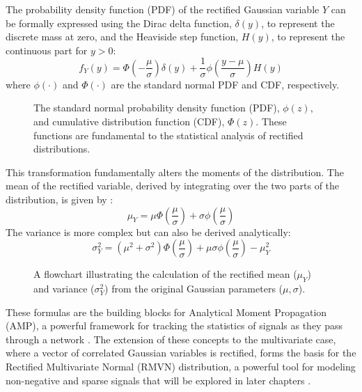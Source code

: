 The probability density function (PDF) of the rectified Gaussian variable $Y$ can be formally expressed using the Dirac delta function, $\delta(y)$, to represent the discrete mass at zero, and the Heaviside step function, $H(y)$, to represent the continuous part for $y > 0$:
\[ f_Y(y) = \Phi\left(-\frac{\mu}{\sigma}\right) \delta(y) + \frac{1}{\sigma} \phi\left(\frac{y-\mu}{\sigma}\right) H(y) \]
where $\phi(\cdot)$ and $\Phi(\cdot)$ are the standard normal PDF and CDF, respectively.

\begin{figure}[h!]
    \centering
    \scalebox{0.9}{\normalpdfcdfplot}
    \caption{The standard normal probability density function (PDF), $\phi(z)$, and cumulative distribution function (CDF), $\Phi(z)$. These functions are fundamental to the statistical analysis of rectified distributions.}
    \label{fig:normal_plot}
\end{figure}

This transformation fundamentally alters the moments of the distribution. The mean of the rectified variable, derived by integrating over the two parts of the distribution, is given by \cite{Socci1998RectifiedGaussian}:
\begin{equation}
 \mu_Y = \mu \Phi\left(\frac{\mu}{\sigma}\right) + \sigma \phi\left(\frac{\mu}{\sigma}\right)
\end{equation}
The variance is more complex but can also be derived analytically:
\begin{equation}
 \sigma^2_Y = (\mu^2 + \sigma^2)\Phi\left(\frac{\mu}{\sigma}\right) + \mu\sigma\phi\left(\frac{\mu}{\sigma}\right) - \mu_Y^2
\end{equation}

\begin{figure}[h!]
    \centering
    \scalebox{0.7}{\momentcalculationdiagram}
    \caption{A flowchart illustrating the calculation of the rectified mean ($\mu_Y$) and variance ($\sigma^2_Y$) from the original Gaussian parameters ($\mu, \sigma$).}
    \label{fig:moment_calculation}
\end{figure}

These formulas are the building blocks for Analytical Moment Propagation (AMP), a powerful framework for tracking the statistics of signals as they pass through a network \cite{Wright2024AnalyticCovariance}. The extension of these concepts to the multivariate case, where a vector of correlated Gaussian variables is rectified, forms the basis for the Rectified Multivariate Normal (RMVN) distribution, a powerful tool for modeling non-negative and sparse signals that will be explored in later chapters \cite{ChoSaul2014RectifiedGaussian}.

